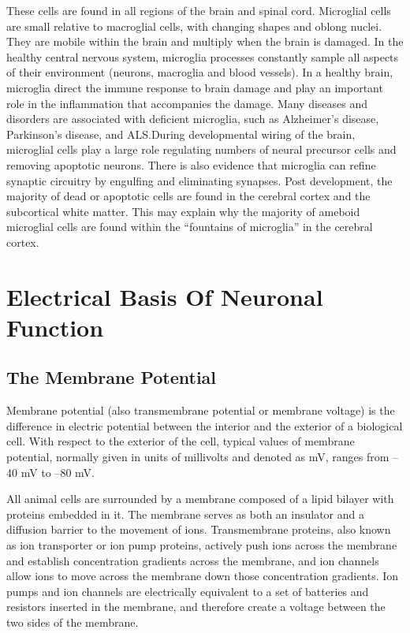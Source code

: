 \documentclass[]{book}
\begin{document}
These cells are found in all regions of the brain and spinal cord. Microglial cells are small relative to macroglial cells, with changing shapes and oblong nuclei. They are mobile within the brain and multiply when the brain is damaged. In the healthy central nervous system, microglia processes constantly sample all aspects of their environment (neurons, macroglia and blood vessels). In a healthy brain, microglia direct the immune response to brain damage and play an important role in the inflammation that accompanies the damage. Many diseases and disorders are associated with deficient microglia, such as Alzheimer's disease, Parkinson's disease, and ALS.During developmental wiring of the brain, microglial cells play a large role regulating numbers of neural precursor cells and removing apoptotic neurons. There is also evidence that microglia can refine synaptic circuitry by engulfing and eliminating synapses. Post development, the majority of dead or apoptotic cells are found in the cerebral cortex and the subcortical white matter. This may explain why the majority of ameboid microglial cells are found within the ``fountains of microglia'' in the cerebral cortex.

\hypertarget{electrical-basis-of-neuronal-function}{%
\chapter{Electrical Basis Of Neuronal Function}\label{electrical-basis-of-neuronal-function}}

\hypertarget{the-membrane-potential}{%
\section{The Membrane Potential}\label{the-membrane-potential}}

Membrane potential (also transmembrane potential or membrane voltage) is the difference in electric potential between the interior and the exterior of a biological cell. With respect to the exterior of the cell, typical values of membrane potential, normally given in units of millivolts and denoted as mV, ranges from --40 mV to --80 mV.

All animal cells are surrounded by a membrane composed of a lipid bilayer with proteins embedded in it. The membrane serves as both an insulator and a diffusion barrier to the movement of ions. Transmembrane proteins, also known as ion transporter or ion pump proteins, actively push ions across the membrane and establish concentration gradients across the membrane, and ion channels allow ions to move across the membrane down those concentration gradients. Ion pumps and ion channels are electrically equivalent to a set of batteries and resistors inserted in the membrane, and therefore create a voltage between the two sides of the membrane.
\end{document}
